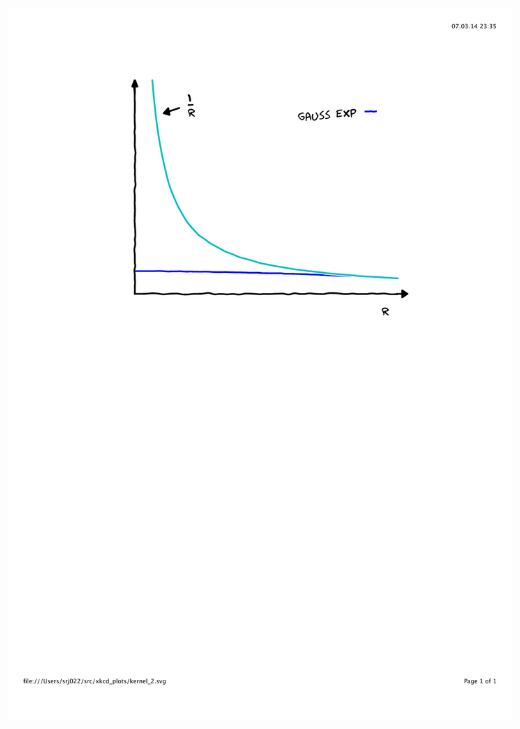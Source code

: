 \begin{frame}
\begin{columns}
\begin{column}{.45\textwidth}
{        \includegraphics[scale=0.4, clip, viewport = 110 450 490 800] {figures/kernel_2.pdf}}
\end{column}
\end{columns}
\end{frame}
